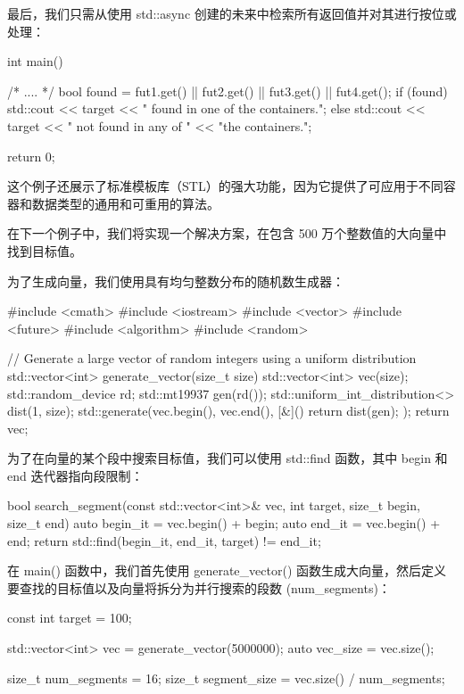 最后，我们只需从使用 std::async 创建的未来中检索所有返回值并对其进行按位或处理：

\begin{cpp}
int main() {
    /* .... */
    bool found = fut1.get() || fut2.get() ||
    fut3.get() || fut4.get();
    if (found) {
        std::cout << target
                  << " found in one of the containers.\n";
    } else {
        std::cout << target
                  << " not found in any of "
                  << "the containers.\n";
    }

    return 0;
}
\end{cpp}

这个例子还展示了标准模板库（STL）的强大功能，因为它提供了可应用于不同容器和数据类型的通用和可重用的算法。


在下一个例子中，我们将实现一个解决方案，在包含 500 万个整数值的大向量中找到目标值。

为了生成向量，我们使用具有均匀整数分布的随机数生成器：

\begin{cpp}
#include <cmath>
#include <iostream>
#include <vector>
#include <future>
#include <algorithm>
#include <random>

// Generate a large vector of random integers using a uniform
distribution
std::vector<int> generate_vector(size_t size) {
    std::vector<int> vec(size);
    std::random_device rd;
    std::mt19937 gen(rd());
    std::uniform_int_distribution<> dist(1, size);
    std::generate(vec.begin(), vec.end(), [&]() {
        return dist(gen);
    });
    return vec;
}
\end{cpp}

为了在向量的某个段中搜索目标值，我们可以使用 std::find 函数，其中 begin 和 end 迭代器指向段限制：

\begin{cpp}
bool search_segment(const std::vector<int>& vec, int target, size_t
begin, size_t end) {
    auto begin_it = vec.begin() + begin;
    auto end_it = vec.begin() + end;
    return std::find(begin_it, end_it, target) != end_it;
}
\end{cpp}

在 main() 函数中，我们首先使用 generate\_vector() 函数生成大向量，然后定义要查找的目标值以及向量将拆分为并行搜索的段数 (num\_segments)：

\begin{cpp}
const int target = 100;

std::vector<int> vec = generate_vector(5000000);
auto vec_size = vec.size();

size_t num_segments = 16;
size_t segment_size = vec.size() / num_segments;
\end{cpp}

